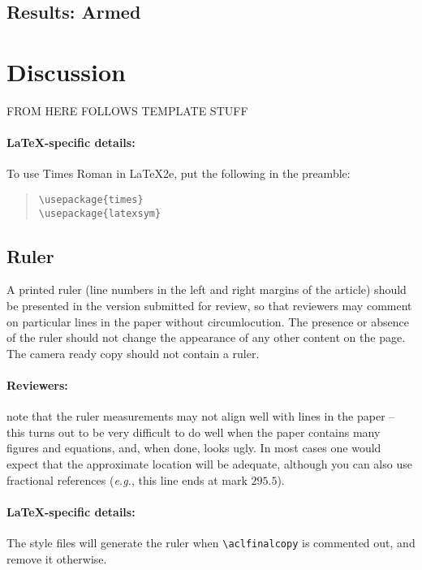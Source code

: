 \documentclass[11pt,a4paper]{article}
\begin{document}
\subsection{Results: Armed}

\section{Discussion}
\label{sec:discussion}

FROM HERE FOLLOWS TEMPLATE STUFF


\paragraph{\LaTeX-specific details:}
To use Times Roman in \LaTeX2e{}, put the following in the preamble:
\begin{quote}
\small
\begin{verbatim}
\usepackage{times}
\usepackage{latexsym}
\end{verbatim}
\end{quote}


\subsection{Ruler}
A printed ruler (line numbers in the left and right margins of the article) should be presented in the version submitted for review, so that reviewers may comment on particular lines in the paper without circumlocution.
The presence or absence of the ruler should not change the appearance of any other content on the page.
The camera ready copy should not contain a ruler.

\paragraph{Reviewers:}
note that the ruler measurements may not align well with lines in the paper -- this turns out to be very difficult to do well when the paper contains many figures and equations, and, when done, looks ugly.
In most cases one would expect that the approximate location will be adequate, although you can also use fractional references (\emph{e.g.}, this line ends at mark $295.5$).

\paragraph{\LaTeX-specific details:}
The style files will generate the ruler when {\small\verb|\aclfinalcopy|} is commented out, and remove it otherwise.
\end{document}
